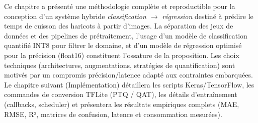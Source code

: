 Ce chapitre a présenté une méthodologie complète et reproductible pour la conception d'un système hybride \emph{classification $\rightarrow$ régression} destiné à prédire le temps de cuisson des haricots à partir d'images. La séparation des jeux de données et des pipelines de prétraitement, l'usage d'un modèle de classification quantifié INT8 pour filtrer le domaine, et d'un modèle de régression optimisé pour la précision (float16) constituent l'ossature de la proposition. Les choix techniques (architectures, augmentations, stratégies de quantification) sont motivés par un compromis précision/latence adapté aux contraintes embarquées. Le chapitre suivant (Implémentation) détaillera les scripts Keras/TensorFlow, les commandes de conversion TFLite (PTQ / QAT), les détails d'entraînement (callbacks, scheduler) et présentera les résultats empiriques complets (MAE, RMSE, R², matrices de confusion, latence et consommation mesurées).

